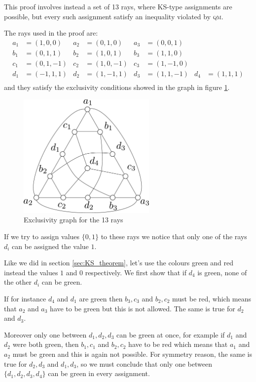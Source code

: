 \documentclass[a4paper]{article}
\newcommand{\acron}[1]{\textsc{#1}}
\newcommand{\QM}{\acron{qm}}
\theoremstyle{definition}
\let\oldproof\proof
\let\oldendproof\endproof
\renewenvironment{proof}
    {
        \begin{framed} 
        \oldproof
    }
    {
        \oldendproof 
        \end{framed}
    }
\begin{document}
This proof involves instead a set of 13 rays, where KS-type assignments are
possible, but every such assignment satisfy an inequality violated by \QM{}.

The rays used in the proof are:
\begin{align}
    a_1 &= (1,0,0) &a_2 &= (0,1,0) &a_3 &= (0,0,1) && \\
    b_1 &= (0,1,1) &b_2 &= (1,0,1) &b_3 &= (1,1,0) &&\\
    c_1 &= (0,1,-1) &c_2 &= (1,0,-1) &c_3 &= (1,-1,0) &&\\
    d_1 &= (-1,1,1) &d_2 &= (1,-1,1) &d_3 &= (1,1,-1) &d_4 &= (1,1,1)\\
    \label{eq:YO13_rays}
\end{align}
and they satisfy the exclusivity conditions showed in the graph in figure
\ref{fig:YO13_graph}.
\begin{figure}[h]
    \centering
    \includegraphics[width=0.6\textwidth]{YO13pg.pdf}
    \caption{Exclusivity graph for the 13 rays}
    \label{fig:YO13_graph}
\end{figure}

If we try to assign values $\{0,1\}$ to these rays we notice that only one of
the rays $d_i$ can be assigned the value $1$.

\begin{proof}
Like we did in section \ref{sec:KS_theorem}, let's use the colours green and
red instead the values $1$ and $0$ respectively.
We first show that if $d_4$ is green, none of the other $d_i$ can be green.

If for instance $d_4$ and $d_1$ are green then $b_3,c_3$ and $b_2,c_2$
must be red, which means that $a_2$ and $a_3$ have to be green but this is not
allowed. The same is true for $d_2$ and $d_3$.

Moreover only one between $d_1,d_2,d_3$ can be green at once, for example if $d_1$ and
$d_2$ were both green, then $b_1,c_1$ and $b_2,c_2$ have to be red which means
that $a_1$ and $a_2$ must be green and this is again not possible.
For symmetry reason, the same is true for $d_2,d_3$ and $d_1,d_3$, so we must
conclude that only one between $\{d_1,d_2,d_3,d_4\}$ can be green in every
assignment.
\end{proof}
\end{document}
